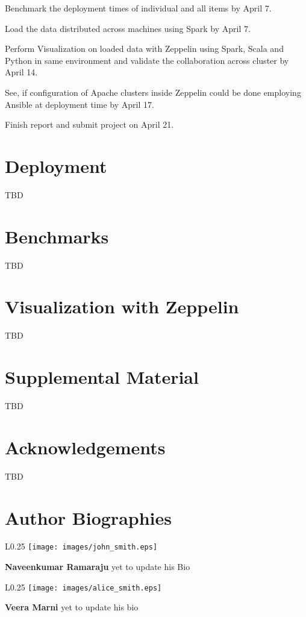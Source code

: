 \documentclass[9pt,twocolumn,twoside]{../../styles/osajnl}
\begin{document}
Benchmark the deployment times of individual and all items by April 7.

Load the data distributed across machines using Spark by April 7.

Perform Visualization on loaded data with Zeppelin using Spark, Scala and Python in same environment and validate the collaboration across cluster by April 14.

See, if configuration of Apache clusters inside Zeppelin could be done employing Ansible at deployment time by April 17.

Finish report and submit project on April 21.


\section{Deployment}
TBD


\section{Benchmarks}
TBD

\section{Visualization with Zeppelin}
TBD

\section{Supplemental Material}
TBD

\section*{Acknowledgements}

TBD




 
\section*{Author Biographies}
\begingroup
\setlength\intextsep{0pt}
\begin{minipage}[t][3.2cm][t]{1.0\columnwidth} %
  \begin{wrapfigure}{L}{0.25\columnwidth}
    \texttt{[image: images/john\_smith.eps]}
  \end{wrapfigure}
  \noindent
  {\bfseries Naveenkumar Ramaraju} yet to update his Bio\end{minipage}
\begin{minipage}[t][3.2cm][t]{1.0\columnwidth} %
  \begin{wrapfigure}{L}{0.25\columnwidth}
    \texttt{[image: images/alice\_smith.eps]}
  \end{wrapfigure}
  \noindent
  {\bfseries Veera Marni} yet to update his bio
\end{minipage}
\end{document}
